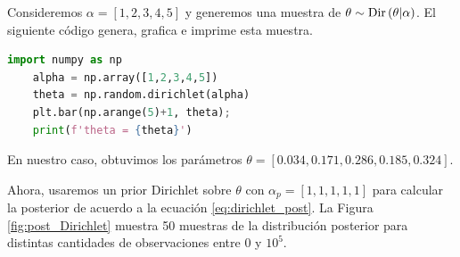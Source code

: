 \begin{example}
	Consideremos $\alpha = [1,2,3,4,5]$ y generemos una muestra de $\theta\sim\text{Dir}\left(\theta|\alpha\right)$. El siguiente código genera, grafica e imprime esta muestra. 
	\begin{lstlisting}[language=Python]
	import numpy as np
	alpha = np.array([1,2,3,4,5]) 
	theta = np.random.dirichlet(alpha)
	plt.bar(np.arange(5)+1, theta);
	print(f'theta = {theta}')
\end{lstlisting}
En nuestro caso, obtuvimos los parámetros $ \theta = [0.034, 0.171, 0.286, 0.185, 0.324]$.

 Ahora, usaremos un prior Dirichlet sobre $\theta$ con $\alpha_p = [1,1,1,1,1]$ para calcular la posterior de acuerdo a la ecuación \eqref{eq:dirichlet_post}. La Figura \ref{fig:post_Dirichlet} muestra 50 muestras de la distribución posterior para distintas cantidades de observaciones entre 0 y  $ 10^5$. 


\end{example}

